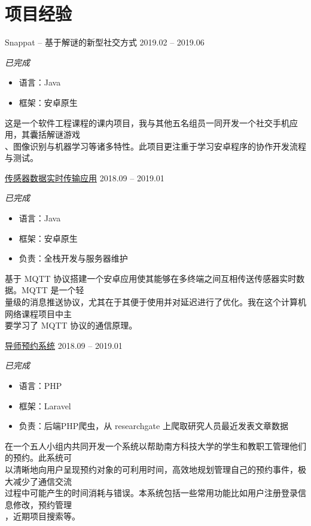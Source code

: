 \documentclass[hidelinks__VERSION__]{adamyi-cv}
\begin{document}
\pagebreak



\section{\heir 项目\heir 经验}

\begin{entrylist}


\entry
{\heir Snappat -- 基于解谜的新型社交方式}
{2019.02 -- 2019.06}
{\emph{\hei 已完成}
\begin{itemize}
    \item \hei 语言：Java
    \item \hei 框架：安卓原生
\end{itemize}
{\hei
这是一个软件工程课程的课内项目，我与其他五名组员一同开发一个社交手机应用，其囊括解谜游戏\\
、图像识别与机器学习等诸多特性。此项目更注重于学习安卓程序的协作开发流程与测试。
}}


\entry
{\href{https://github.com/hackroid/MqttSensorDemo}{\heir 传感器数据实时传输应用}}
{2018.09 -- 2019.01}
{\emph{\hei 已完成}
\begin{itemize}
    \item \hei 语言：Java
    \item \hei 框架：安卓原生
    \item \hei 负责：全栈开发与服务器维护
\end{itemize}
{\hei
基于 MQTT 协议搭建一个安卓应用使其能够在多终端之间互相传送传感器实时数据。MQTT 是一个轻\\
量级的消息推送协议，尤其在于其便于使用并对延迟进行了优化。我在这个计算机网络课程项目中主\\
要学习了 MQTT 协议的通信原理。
}}


\entry
{\href{https://github.com/zhaoweizhong/Faculty-Reservation}{\heir 导师预约系统}}
{2018.09 -- 2019.01}
{\emph{\hei 已完成}
\begin{itemize}
    \item \hei 语言：PHP
    \item \hei 框架：Laravel
    \item \hei 负责：后端PHP爬虫，从 researchgate 上爬取研究人员最近发表文章数据
\end{itemize}
{\hei
在一个五人小组内共同开发一个系统以帮助南方科技大学的学生和教职工管理他们的预约。此系统可\\
以清晰地向用户呈现预约对象的可利用时间，高效地规划管理自己的预约事件，极大减少了通信交流\\
过程中可能产生的时间消耗与错误。本系统包括一些常用功能比如用户注册登录信息修改，预约管理\\
，近期项目搜索等。
}}



\end{entrylist}
\end{document}
